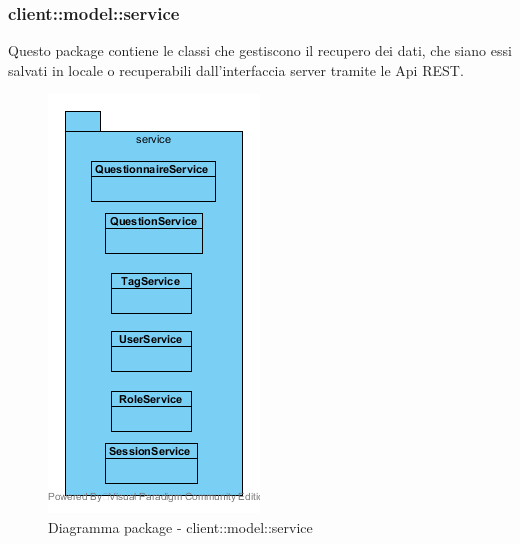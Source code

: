 \subsubsection{client::model::service}
Questo package contiene le classi che gestiscono il recupero dei dati, che siano essi salvati in locale o recuperabili dall'interfaccia server tramite le Api REST.\begin{center}
	\begin{figure}[H]
		\centering \includegraphics[scale=4, max width=\textwidth, max height=\myheight]{../img/diagrammiClassi/client/model/service.png}
		\caption{Diagramma package - client::model::service}
	\end{figure}
\end{center}\hypertarget{client::model::service::SessionService}{}
